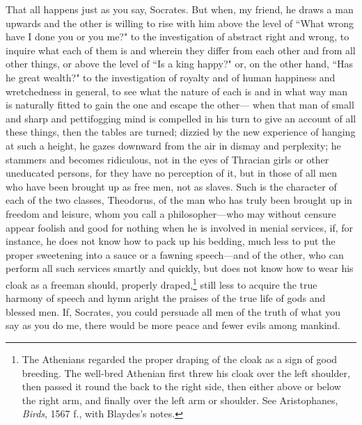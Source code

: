\documentclass[letterpaper,12pt]{article}
\newcommand{\stephpag}[1]{\marginnote{\small\itshape\fontfamily{ppl}\selectfont #1}}
\begin{document}
\begin{drama}
\theodorusspeaks
That all happens just as you say, Socrates.
\socratesspeaks
But when, my friend, \stephpag{c} he draws a man upwards and the other is willing to rise with him above the level of ``What wrong have I done you or you me?" to the investigation of abstract right and wrong, to inquire what each of them is and wherein they differ from each other and from all other things, or above the level of ``Is a king happy?" or, on the other hand, ``Has he great wealth?" to the investigation of royalty and of human happiness and wretchedness in general, to see what the nature of each is and in what way man is naturally fitted to gain the one and escape the other— \stephpag{d} when that man of small and sharp and pettifogging mind is compelled in his turn to give an account of all these things, then the tables are turned; dizzied by the new experience of hanging at such a height, he gazes downward from the air in dismay and perplexity; he stammers and becomes ridiculous, not in the eyes of Thracian girls or other uneducated persons, for they have no perception of it, but in those of all men who have been brought up as free men, not as slaves. Such is the character of each of the two classes, Theodorus, of the man who has truly been brought up in freedom \stephpag{e} and leisure, whom you call a philosopher—who may without censure appear foolish and good for nothing when he is involved in menial services, if, for instance, he does not know how to pack up his bedding, much less to put the proper sweetening into a sauce or a fawning speech—and of the other, who can perform all such services smartly and quickly, but does not know how to wear his cloak as a freeman should, properly draped,\footnote{The Athenians regarded the proper draping of the cloak as a sign of good breeding. The well-bred Athenian first threw his cloak over the left shoulder, then passed it round the back to the right side, then either above or below the right arm, and finally over the left arm or shoulder. See Aristophanes, \emph{Birds}, 1567 f., with Blaydes's notes.} still less to acquire the true harmony of speech \stephpag{176 a} and hymn aright the praises of the true life of gods and blessed men.
\theodorusspeaks
If, Socrates, you could persuade all men of the truth of what you say as you do me, there would be more peace and fewer evils among mankind.
\socratesspeaks

\end{drama}
\end{document}

